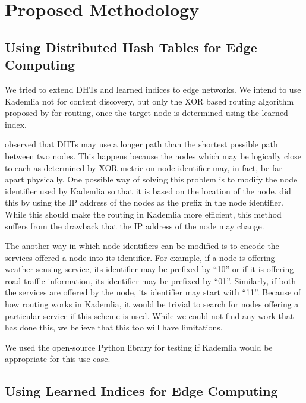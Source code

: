 \chapter{Proposed Methodology}

\section{Using Distributed Hash Tables for Edge Computing}

We tried to extend DHTs and learned indices to edge networks. We intend to use
Kademlia not for content discovery, but only the XOR based routing algorithm
proposed by \citet{petarmaymounkovKademliaPeertoPeerInformation2002} for
routing, once the target node is determined using the learned index.

\citet{xieEfficientIndexingMechanism2019} observed that DHTs may use a longer
path than the shortest possible path between two nodes. This happens because the
nodes which may be logically close to each as determined by XOR metric on node
identifier may, in fact, be far apart physically. One possible way of solving
this problem is to modify the node identifier used by Kademlia so that it is
based on the location of the node. \citet{mengweiImprovementKademliaBased2013}
did this by using the IP address of the nodes as the prefix in the node
identifier. While this should make the routing in Kademlia more efficient, this
method suffers from the drawback that the IP address of the node may change.

The another way in which node identifiers can be modified is to encode the
services offered a node into its identifier. For example, if a node is offering
weather sensing service, its identifier may be prefixed by ``10'' or if it is
offering road-traffic information, its identifier may be prefixed by ``01''.
Similarly, if both the services are offered by the node, its identifier may
start with ``11''. Because of how routing works in Kademlia, it would be trivial
to search for nodes offering a particular service if this scheme is used. While
we could not find any work that has done this, we believe that this too will
have limitations.

We used the open-source Python library for testing if Kademlia would be
appropriate for this use case. \cite{KademliaIndexRst}

\section{Using Learned Indices for Edge Computing}


